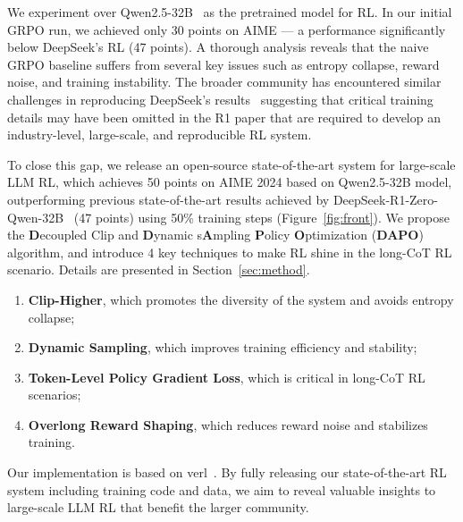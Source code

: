 We experiment over Qwen2.5-32B~\cite{yang2024qwen2} as the pretrained model for RL. In our initial GRPO run, we achieved only 30 points on AIME — a performance significantly below DeepSeek’s RL (47 points). A thorough analysis reveals that the naive GRPO baseline suffers from several key issues such as entropy collapse, reward noise, and training instability. The broader community has encountered similar challenges in reproducing DeepSeek's results~\cite{rendarl,OpenReasonerZero2025,hu2025reinforce++,cui2025process,lee2024token,kazemnejad2024vineppo,yuan2025s} suggesting that critical training details may have been omitted in the R1 paper that are required to develop an industry-level, large-scale, and reproducible RL system.

To close this gap, we release an open-source state-of-the-art system for large-scale LLM RL, which achieves 50 points on AIME 2024 based on Qwen2.5-32B model, outperforming previous state-of-the-art results achieved by DeepSeek-R1-Zero-Qwen-32B~\cite{guo2025deepseek} (47 points) using 50\% training steps (Figure~\ref{fig:front}). We propose the \textbf{D}ecoupled Clip and \textbf{D}ynamic s\textbf{A}mpling \textbf{P}olicy \textbf{O}ptimization (\textbf{DAPO}) algorithm, and introduce 4 key techniques to make RL shine in the long-CoT RL scenario. Details are presented in Section~\ref{sec:method}.
\begin{enumerate}
    \item \textbf{Clip-Higher}, which promotes the diversity of the system and avoids entropy collapse;
    \item \textbf{Dynamic Sampling}, which improves training efficiency and stability;
    \item \textbf{Token-Level Policy Gradient Loss}, which is critical in long-CoT RL scenarios;
    \item \textbf{Overlong Reward Shaping}, which reduces reward noise and stabilizes training.
\end{enumerate}
Our implementation is based on verl~\cite{sheng2024hybridflow}. By fully releasing our state-of-the-art RL system including training code and data, we aim to reveal valuable insights to large-scale LLM RL that benefit the larger community.
